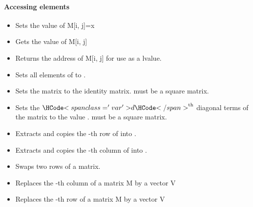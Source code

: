 \paragraph{Accessing elements}

\begin{itemize}
\item {}
  \sshortdescribe Sets the value of M[i, j]=x  

\item {}
  \sshortdescribe Gets the value of M[i, j]  

\item {}
  \sshortdescribe Returns the address of M[i, j] for use as a lvalue.

\item {}
  \sshortdescribe Sets all elements of  to .
  
\item {}
  \sshortdescribe Sets the matrix  to the identity
  matrix.  must be a square matrix.

\item {}
  \sshortdescribe Sets the $\var{d}^{\text{th}}$ diagonal terms of the matrix
   to the value .  must be a square matrix.

\item {}
  \sshortdescribe Extracts and copies the -th row of  into
  .

\item {}
  \sshortdescribe Extracts and copies the -th column of  into .
  
\item {}
  \sshortdescribe Swaps two rows of a matrix.  

\item {}
  \sshortdescribe Replaces the -th column of a matrix M by a vector V 

\item {}
  \sshortdescribe Replaces the -th row of a matrix M by a vector V  
\end{itemize}

